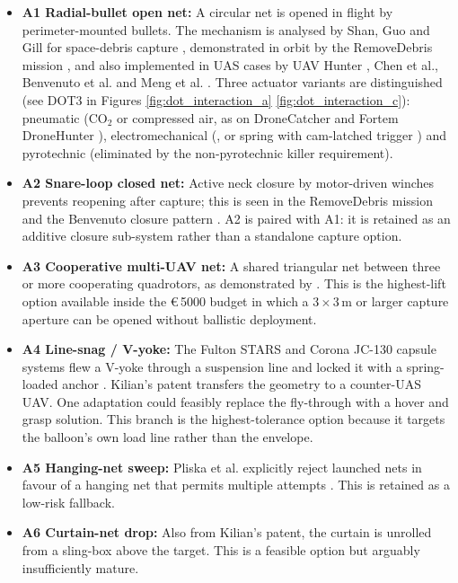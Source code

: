 \begin{itemize}[leftmargin=*]
    \item \textbf{A1 Radial-bullet open net:} A circular net is opened in flight by perimeter-mounted bullets. The mechanism is analysed by Shan, Guo and Gill for space-debris capture  \cite{Shan2017DeploymentRemoval}, demonstrated in orbit by the RemoveDebris mission  \cite{Forshaw2020TheLaunch,Aglietti2020TheOperations}, and also implemented in UAS cases by UAV Hunter \cite{Zhang2024UAVDefense}, Chen et al.\cite{Chen2022AnTechnology}, Benvenuto et al.\cite{Benvenuto2015DynamicsRemoval} and Meng et al. \cite{XinMeng20182018China}. Three actuator variants are distinguished (see DOT3 in Figures \ref{fig:dot_interaction_a} \ref{fig:dot_interaction_c}): pneumatic (CO$_2$ or compressed air, as on DroneCatcher \cite{DroneCatcher} and Fortem DroneHunter \cite{Fortem}), electromechanical (\cite{Chen2022AnTechnology}, or spring with cam-latched trigger \cite{XinMeng20182018China}) and pyrotechnic (eliminated by the non-pyrotechnic killer requirement). 

    \item \textbf{A2 Snare-loop closed net:} Active neck closure by motor-driven winches prevents reopening after capture; this is seen in the RemoveDebris mission \cite{Forshaw2020TheLaunch,Aglietti2020TheOperations} and the Benvenuto closure pattern \cite{Benvenuto2015DynamicsRemoval}. A2 is paired with A1: it is retained as an additive closure sub-system rather than a standalone capture option.

    \item \textbf{A3 Cooperative multi-UAV net:} A shared triangular net between three or more cooperating quadrotors, as demonstrated by \cite{Ritz2012CooperativeCatching}. This is the highest-lift option available inside the \euro\,5000 budget in which a $3\times 3\,\mathrm{m}$ or larger capture aperture can be opened without ballistic deployment.

    \item \textbf{A4 Line-snag / V-yoke:} The Fulton STARS and Corona JC-130 capsule systems flew a V-yoke through a suspension line and locked it with a spring-loaded anchor \cite{Kilian2018UnmannedUAVs}. Kilian's patent transfers the geometry to a counter-UAS UAV. One adaptation could feasibly replace the fly-through with a hover and grasp solution. This branch is the highest-tolerance  option  because it targets the balloon's own load line rather than the envelope.

    \item \textbf{A5 Hanging-net sweep:} Pliska et al. explicitly reject launched nets in favour of a hanging net that permits multiple attempts \cite{Pliska2024TowardsCapture}. This is retained as a low-risk fallback.

    \item \textbf{A6 Curtain-net drop:} Also from Kilian's patent, the curtain is unrolled from a sling-box above the target. This is a feasible option but arguably insufficiently mature.
    
\end{itemize}


